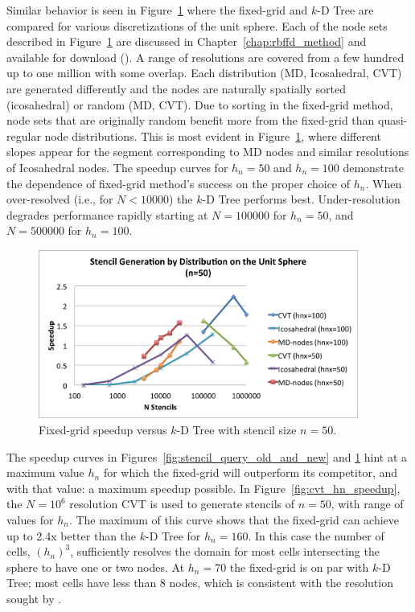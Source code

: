 \documentclass{report}
\begin{document}
Similar behavior is seen in Figure~\ref{fig:speedup_sphere} where the fixed-grid and $k$-D Tree are compared for various discretizations of the unit sphere. Each of the node sets described in Figure~\ref{fig:speedup_sphere} are discussed in Chapter~\ref{chap:rbffd_method} and available for download (\cite{BolligSphereGrids}). A range of resolutions are covered from a few hundred up to one million with some overlap. Each distribution (MD, Icosahedral, CVT) are generated differently and the nodes are naturally spatially sorted (icosahedral) or random (MD, CVT). Due to sorting in the fixed-grid method, node sets that are originally random benefit more from the fixed-grid than quasi-regular node distributions. This is most evident in Figure~\ref{fig:speedup_sphere}, where different slopes appear for the segment corresponding to MD nodes and similar resolutions of Icosahedral nodes. The speedup curves for $h_n=50$ and $h_n=100$ demonstrate the dependence of fixed-grid method's success on the proper choice of $h_n$. When over-resolved (i.e., for $N < 10000$) the $k$-D Tree performs best. Under-resolution degrades performance rapidly starting at $N=100000$ for $h_n=50$, and $N=500000$ for $h_n=100$. 


\begin{figure}
\centering
\includegraphics[width=10.5cm]{../figures/stencils/sphere_stencil_gen_speedup.png}
\caption{Fixed-grid speedup versus $k$-D Tree with stencil size $n=50$.}
\label{fig:speedup_sphere}
\end{figure}


The speedup curves in Figures~\ref{fig:stencil_query_old_and_new} and \ref{fig:speedup_sphere} hint at a maximum value $h_n$ for which the fixed-grid will outperform its competitor, and with that value: a maximum speedup possible. In Figure~\ref{fig:cvt_hn_speedup}, the $N=10^6$ resolution CVT is used to generate stencils of $n=50$, with range of values for $h_n$. The maximum of this curve shows that the fixed-grid can achieve up to 2.4x better than the $k$-D Tree for $h_n=160$. In this case the number of cells, $(h_n)^3$, sufficiently resolves the domain for most cells intersecting the sphere to have one or two nodes. At $h_n=70$ the fixed-grid is on par with $k$-D Tree; most cells have less than 8 nodes, which is consistent with the resolution sought by \cite{Krog2010,Goswami2010,Green2010}.
\end{document}
